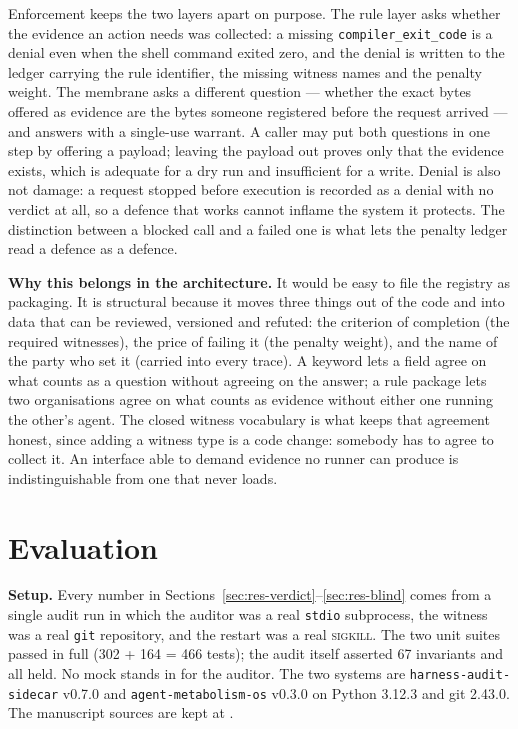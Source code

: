 \documentclass[conference]{IEEEtran}
\begin{document}
Enforcement keeps the two layers apart on purpose. The rule layer asks whether
the evidence an action needs was collected: a missing \texttt{compiler\_exit\_code}
is a denial even when the shell command exited zero, and the denial is written to
the ledger carrying the rule identifier, the missing witness names and the
penalty weight. The membrane asks a different question --- whether the exact bytes
offered as evidence are the bytes someone registered before the request arrived
--- and answers with a single-use warrant. A caller may put both questions in one
step by offering a payload; leaving the payload out proves only that the evidence
exists, which is adequate for a dry run and insufficient for a write. Denial is
also not damage: a request stopped before execution is recorded as a denial with
no verdict at all, so a defence that works cannot inflame the system it protects.
The distinction between a blocked call and a failed one is what lets the
penalty ledger read a defence as a defence.

\textbf{Why this belongs in the architecture.}
It would be easy to file the registry as packaging. It is structural because it
moves three things out of the code and into data that can be reviewed, versioned
and refuted: the criterion of completion (the required witnesses), the price of
failing it (the penalty weight), and the name of the party who set it (carried
into every trace). A keyword lets a field agree on what counts as a question
without agreeing on the answer; a rule package lets two organisations agree on
what counts as evidence without either one running the other's agent. The closed
witness vocabulary is what keeps that agreement honest, since adding a witness
type is a code change: somebody has to agree to collect it. An interface able to
demand evidence no runner can produce is indistinguishable from one that never
loads.

\section{Evaluation}
\label{sec:eval}

\textbf{Setup.}
Every number in Sections~\ref{sec:res-verdict}--\ref{sec:res-blind} comes from a
single audit run in which the auditor was a real \texttt{stdio} subprocess, the
witness was a real \texttt{git} repository, and the restart was a real
\textsc{sigkill}. The two unit suites passed in full
(302 + 164 = 466 tests); the audit itself asserted 67 invariants and all held.
No mock stands in for the auditor. The two systems are
\texttt{harness-audit-sidecar} v0.7.0 \cite{liaozhizhi2026sidecar} and
\texttt{agent-metabolism-os} v0.3.0 \cite{liaozhizhi2026metabolism} on
Python 3.12.3 and git 2.43.0. The manuscript sources are kept at
\cite{liaozhizhi2026methodtransfer}.
\end{document}
